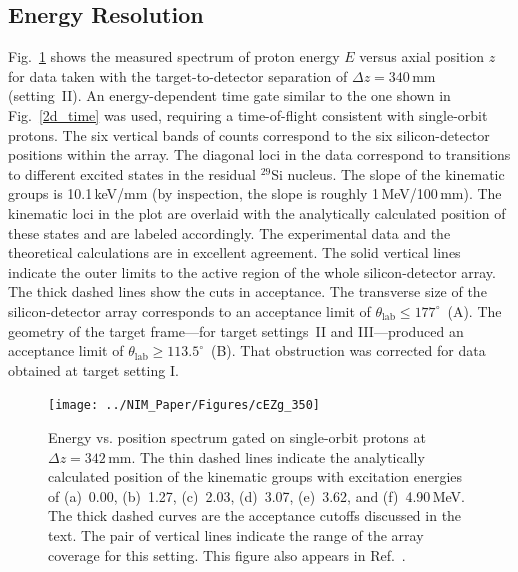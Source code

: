 \subsection{Energy Resolution}
Fig.~\ref{cezg_350} shows the measured spectrum of proton energy $E$ versus axial position $z$ for data taken with the target-to-detector separation of $\Delta z=340$\,mm (setting~II).  An energy-dependent time gate similar to the one shown in Fig.~\ref{2d_time} was used, requiring a time-of-flight consistent with single-orbit protons.    The six vertical
bands of counts correspond to the six silicon-detector positions
within the array.  The diagonal loci in the data correspond to transitions to different excited states in
the residual $^{29}$Si nucleus.  The slope of the kinematic groups is 10.1\,keV/mm (by inspection, the slope is roughly 1\,MeV/100\,mm).  The kinematic loci in the plot are overlaid with the analytically calculated position of these states and are labeled accordingly.  
The experimental data and the theoretical calculations are in excellent agreement.  The solid vertical lines indicate the outer limits to the
active region of the whole silicon-detector array.  The thick dashed
lines show the cuts in acceptance.  The transverse size of the
silicon-detector array corresponds to an acceptance limit of $\theta_\mathrm{lab} \leq 177^\circ$~(A).  
The geometry of the target frame---for target settings~II and III---produced an acceptance limit of $\theta_\mathrm{lab} \geq 113.5^\circ$~(B).  That
obstruction was corrected for data obtained at target setting I.

\begin{figure}[ht]
\texttt{[image: ../NIM\_Paper/Figures/cEZg\_350]}
\caption[Energy vs. position spectrum gated on single-orbit protons at $\Delta z = 342$\,mm]{Energy vs. position spectrum gated on single-orbit protons at $\Delta z = 342$\,mm.
The thin dashed lines %
 indicate the analytically calculated position of the
kinematic groups with excitation energies of (a)~0.00, (b)~1.27, (c)~2.03, (d)~3.07,
(e)~3.62, and (f)~4.90\,MeV. %
 The thick dashed curves are the
acceptance cutoffs discussed in the text. The pair of vertical lines
indicate the range of the array coverage for this setting.  This figure also appears in Ref.~\cite{Lighthall_2010}.}
\label{cezg_350}
\end{figure}

